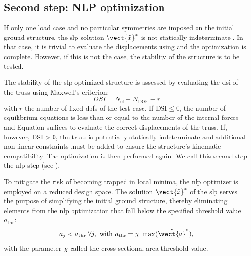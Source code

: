 \subsection{Second step: NLP optimization}
If only one load case and no particular symmetries are imposed on the initial ground structure, the \gls{slp} solution $\vect{\tilde{x}}^*$ is not statically indeterminate . In that case, it is trivial to evaluate the displacements using  and the optimization is complete. However, if this is not the case, the stability of the structure is to be tested. 

The stability of the \gls{slp}-optimized structure is assessed by evaluating the \gls{dsi} of the truss using Maxwell's criterion:
\begin{equation}
    DSI= N_{\text{el}} - N_{\text{DOF}} - r
\end{equation}
with $r$ the number of fixed \gls{dofs} of the test case. If $\text{DSI}\leq0$, the number of equilibrium equations is less than or equal to the number of the internal forces and Equation  suffices to evaluate the correct displacements of the truss. If, however, $\text{DSI}>0$, the truss is potentially statically indeterminate and additional non-linear constraints must be added to ensure the structure's kinematic compatibility. The optimization is then performed again. We call this second step the \gls{nlp} step (see ). 

To mitigate the risk of becoming trapped in local minima, the \gls{nlp} optimizer is employed on a reduced design space. The solution $\vect{\tilde{x}}^*$ of the \gls{slp} serves the purpose of simplifying the initial ground structure, thereby eliminating elements from the \gls{nlp} optimization that fall below the specified threshold value $a_{\text{thr}}$:
\begin{equation}
    a_j<a_{\text{thr}} \; \forall j, \text{ with }a_{\text{thr}} = \chi \; \max(\tilde{\vect{a}}^*),
    \label{eq:04_thr}
\end{equation}
with the parameter $\chi$ called the cross-sectional area threshold value.

